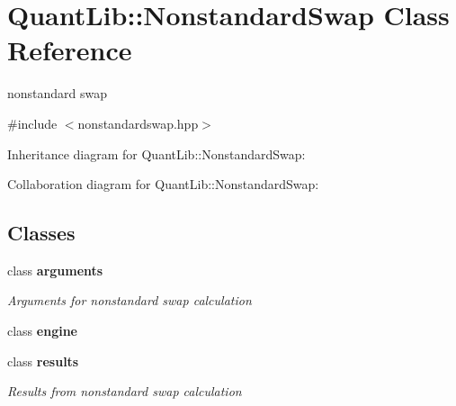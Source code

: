 \section{Quant\+Lib\+:\+:Nonstandard\+Swap Class Reference}
\label{class_quant_lib_1_1_nonstandard_swap}


nonstandard swap  




{\ttfamily \#include $<$nonstandardswap.\+hpp$>$}



Inheritance diagram for Quant\+Lib\+:\+:Nonstandard\+Swap\+:


Collaboration diagram for Quant\+Lib\+:\+:Nonstandard\+Swap\+:
\subsection*{Classes}
\begin{DoxyCompactItemize}
\item 
class {\bf arguments}
\begin{DoxyCompactList}\small\item\em Arguments for nonstandard swap calculation \end{DoxyCompactList}\item 
class {\bf engine}
\item 
class {\bf results}
\begin{DoxyCompactList}\small\item\em Results from nonstandard swap calculation \end{DoxyCompactList}\end{DoxyCompactItemize}
